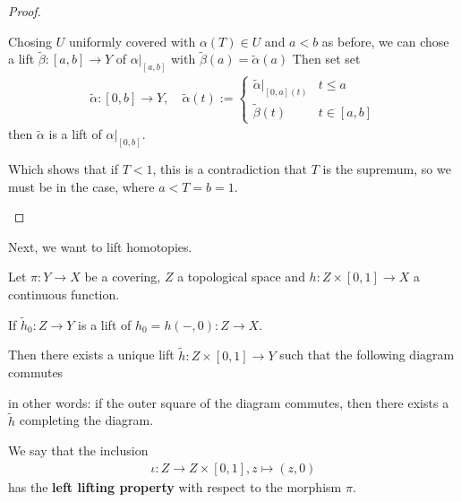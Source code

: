 \begin{proof}
\begin{itemize}
      Chosing $U$ uniformly covered with $\alpha(T) \in U$ and $a<b$ as before, we can chose a lift $\tilde{\beta}:[a,b] \to  Y$ of $\alpha|_{[a,b]}$ with $\tilde{\beta}(a) = \tilde{\alpha}(a)$
      Then set set
      \begin{align*}
        \tilde{\alpha}:[0,b] \to  Y, \quad \tilde{\alpha}(t) := \left\{\begin{array}{ll}
            \tilde{\alpha}|_{[0,a](t)} & t \leq a\\
            \tilde{\beta}(t) &  t \in [a,b]
        \end{array} \right.
      \end{align*}
      then $\tilde{\alpha}$ is a lift of $\alpha|_{[0,b]}$.

      Which shows that if $T<1$, this is a contradiction that $T$ is the supremum, so we must be in the case, where $a < T = b = 1$.
  \end{itemize}
\end{proof}

Next, we want to lift homotopies.
\begin{lem}[]\label{lem:homotopy-lift}
  Let $\pi: Y \to X$ be a covering, $Z$ a topological space and $h: Z \times [0,1] \to  X$ a continuous function.

  If $\tilde{h}_0: Z \to Y$ is a lift of $h_0 = h(-,0): Z \to X$.

  Then there exists a unique lift $\tilde{h}:Z \times [0,1] \to Y$ such that the following diagram commutes
  \begin{center}
  \end{center}
  in other words: if the outer square of the diagram commutes, then there exists a $\tilde{h}$ completing the diagram.

\end{lem}
\begin{rem}[]
  We say that the inclusion
  \begin{align*}
    \iota: Z \to Z \times [0,1], z \mapsto (z,0)
  \end{align*}
  has the \textbf{left lifting property} with respect to the morphism $\pi$.
\end{rem}
